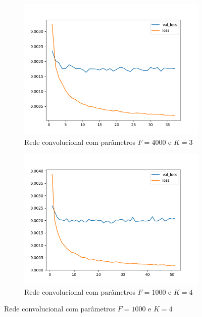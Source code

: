 \begin{figure}[H]
\begin{subfigure}{.5\textwidth}
  \label{fig:cnn-2000-k-3}
\end{subfigure}
\begin{subfigure}{.5\textwidth}
  \centering
  \caption{Rede convolucional com parâmetros $F = 4000$ e $K = 3$}
  \includegraphics[width=.8\linewidth]{figuras/ape-ajustes-hiper-parametros/cnn-4000-k-3.png}
  
  \label{fig:cnn-4000-k-3}
\end{subfigure}
\begin{subfigure}{.5\textwidth}
  \centering
  \caption{Rede convolucional com parâmetros $F = 1000$ e $K = 4$}
  \includegraphics[width=.8\linewidth]{figuras/ape-ajustes-hiper-parametros/cnn-1000-k-4.png}
  

\end{subfigure}
\end{figure}
